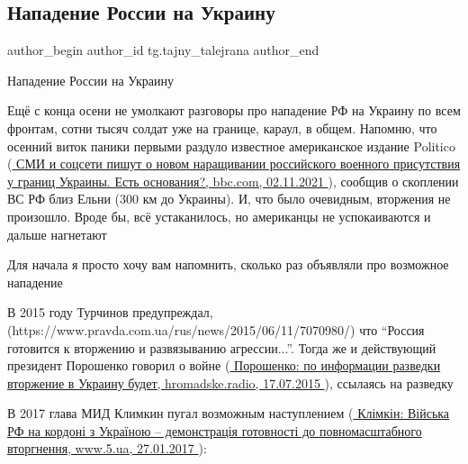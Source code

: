  
 
 
 
 
\subsection{Нападение России на Украину}
\label{sec:22_01_2022.tg.tajny_talejrana.1.napadenie_rossii}
 
\ifcmt
 author_begin
   author_id tg.tajny_talejrana
 author_end
\fi

Нападение России на Украину

Ещё с конца осени не умолкают разговоры про нападение РФ на Украину по всем
фронтам, сотни тысяч солдат уже на границе, караул, в общем. Напомню, что
осенний виток паники первыми раздуло известное американское издание Politico
(\href{https://www.bbc.com/russian/features-59139673}{
СМИ и соцсети пишут о новом наращивании российского военного присутствия у границ Украины. Есть основания?, %
bbc.com, 02.11.2021%
}), сообщив о скоплении ВС РФ близ
Ельни (300 км до Украины). И, что было очевидным, вторжения не произошло. Вроде
бы, всё устаканилось, но американцы не успокаиваются и дальше нагнетают

Для начала я просто хочу вам напомнить, сколько раз объявляли про возможное
нападение 

В 2015 году Турчинов предупреждал,
(https://www.pravda.com.ua/rus/news/2015/06/11/7070980/) что \enquote{Россия готовится
к вторжению и развязыванию агрессии...}. Тогда же и действующий президент
Порошенко говорил о войне
(\href{https://hromadske.radio/ru/news/2015/07/17/poroshenko-po-informacii-razvedki-vtorzhenie-v-ukrainu-budet}{%
Порошенко: по информации разведки вторжение в Украину будет, hromadske.radio, 17.07.2015%
}),
ссылаясь на разведку

В 2017 глава МИД Климкин пугал возможным наступлением
(\href{https://www.5.ua/polityka/klimkin-rozpoviv-chomu-narazi-provedennia-zustrichi-u-normandskomu-formati-nemozhlyve-136977.html}{%
Клімкін: Війська РФ на кордоні з Україною – демонстрація готовності до повномасштабного вторгнення, %
www.5.ua, 27.01.2017%
}):

